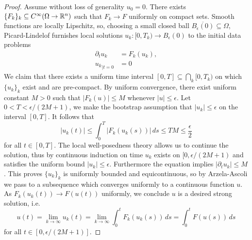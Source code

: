 \begin{proof}
	Assume without loss of generality $u_0 = 0$. There exists $\{ F_k \}_k \subseteq C^\infty (\Omega \to \mathbb R^n)$ such that $F_k \to F$ uniformly on compact sets. Smooth functions are locally Lipschitz, so, choosing a small closed ball $\overline{B_\epsilon (0)} \subseteq \Omega$, Picard-Lindelof furnishes local solutions $u_k : [0, T_k) \to B_\epsilon (0)$ to the initial data problems
	\begin{align*}
		\partial_t u_k 	
			&= F_k(u_k), \\
		{u_k}_{|t = 0}		
			&= 0
	\end{align*}
	We claim that there exists a uniform time interval $[0, T] \subseteq \bigcap_k [0, T_k)$ on which $\{u_k\}_k$ exist and are pre-compact. By uniform convergence, there exist uniform constant $M > 0$ such that $|F_k (u)| \leq M$ whenever $|u| \leq \epsilon$. Let $0 < T < \epsilon/(2M + 1)$, we make the bootstrap assumption that $|u_k| \leq \epsilon$ on the interval $[0, T]$. It follows that
		\[ |u_k (t)| \leq \int_0^T |F_k (u_k (s))| \, ds \leq T M \leq \frac\epsilon2 \]
	for all $t \in [0, T]$. The local well-posedness theory allows us to continue the solution, thus by continuous induction on time $u_k$ exists on $[0, \epsilon/(2M + 1)$ and satisfies the uniform bound $|u_k| \leq \epsilon$. Furthermore the equation implies $|\partial_t u_k| \leq M$. This proves $\{u_k\}_k$ is uniformly bounded and equicontinuous, so by Arzela-Ascoli we pass to a subsequence which converges uniformly to a continuous function $u$. As $F_k (u_k (t)) \to F(u(t))$ uniformly, we conclude $u$ is a desired strong solution, i.e. 
		\[ u(t) = \lim_{k \to \infty} u_k (t) = \lim_{k \to \infty} \int_0^t F_k (u_k (s)) \, ds = \int_0^t F (u(s)) \, ds\]
	for all $t \in [0, \epsilon/(2M + 1)]$. 	
\end{proof}


